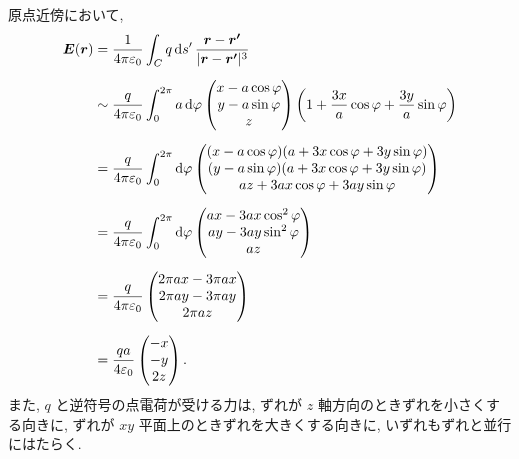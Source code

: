\documentclass[../../ou-physics-exam.tex]{subfiles}
\begin{document}
\begin{answer}
    原点近傍において,
    \begin{align*}
        \bm{E} (\bm{r} ) 
        & = \frac{1}{4 \pi \varepsilon_0} \int_C q \dd{s'} \frac{\bm{r} - \bm{r'} }{|\bm{r} - \bm{r'} |^3 } \\[2mm]
        & \sim \frac{q}{4 \pi \varepsilon_0 } \int_0^{2 \pi } a \dd{\varphi} 
        \begin{pmatrix}
            x - a \cos \varphi \\
            y - a \sin \varphi \\
            z
        \end{pmatrix}
        \qty(1 + \frac{3x}{a} \cos \varphi + \frac{3y}{a} \sin \varphi ) \\[2mm]
        & = \frac{q}{4 \pi \varepsilon_0 } \int_0^{2 \pi } \dd{\varphi } 
        \begin{pmatrix}
            (x - a \cos \varphi) (a + 3x \cos \varphi + 3y \sin \varphi) \\
            (y - a \sin \varphi) (a + 3x \cos \varphi + 3y \sin \varphi) \\
            az + 3ax \cos \varphi + 3ay \sin \varphi
        \end{pmatrix} \\[2mm]
        & = \frac{q}{4 \pi \varepsilon_0 } \int_0^{2 \pi } \dd{\varphi } 
        \begin{pmatrix}
            ax - 3ax \cos^2 \varphi \\
            ay - 3ay \sin^2 \varphi \\
            az
        \end{pmatrix} \\[2mm]
        & = \frac{q}{4 \pi \varepsilon_0 } 
        \begin{pmatrix}
            2 \pi ax - 3 \pi ax \\
            2 \pi ay - 3 \pi ay \\
            2 \pi az
        \end{pmatrix} \\[2mm]
        & = \frac{qa}{4 \varepsilon_0 } 
        \begin{pmatrix}
            -x \\ -y \\ 2z
        \end{pmatrix}.
    \end{align*}
    また, $ q $ と逆符号の点電荷が受ける力は, ずれが $ z $ 軸方向のときずれを小さくする向きに, ずれが $ xy $ 平面上のときずれを大きくする向きに, いずれもずれと並行にはたらく.
\end{answer}
\end{document}
